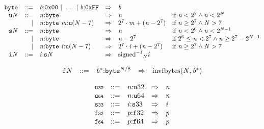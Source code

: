 \vspace{1ex}

\vspace{1ex}

$$
\begin{array}{@{}l@{}rrlll@{}l@{}}
& {\mathtt{byte}} &::=& {\mathit{b}}{:}\mathtt{0x00} ~|~ \dots ~|~ {\mathit{b}}{:}\mathtt{0xFF} &\Rightarrow& {\mathit{b}} \\
& {{\mathtt{u}}}{{\mathit{N}}} &::=& {\mathit{n}}{:}{\mathtt{byte}} &\Rightarrow& {\mathit{n}} &\quad
  \mbox{if}~{\mathit{n}} < {2^{7}} \land {\mathit{n}} < {2^{{\mathit{N}}}} \\ &&|&
{\mathit{n}}{:}{\mathtt{byte}}~{\mathit{m}}{:}{{\mathtt{u}}}{({\mathit{N}} - 7)} &\Rightarrow& {2^{7}} \cdot {\mathit{m}} + ({\mathit{n}} - {2^{7}}) &\quad
  \mbox{if}~{\mathit{n}} \geq {2^{7}} \land {\mathit{N}} > 7 \\
& {{\mathtt{s}}}{{\mathit{N}}} &::=& {\mathit{n}}{:}{\mathtt{byte}} &\Rightarrow& {\mathit{n}} &\quad
  \mbox{if}~{\mathit{n}} < {2^{6}} \land {\mathit{n}} < {2^{{\mathit{N}} - 1}} \\ &&|&
{\mathit{n}}{:}{\mathtt{byte}} &\Rightarrow& {\mathit{n}} - {2^{7}} &\quad
  \mbox{if}~{2^{6}} \leq {\mathit{n}} < {2^{7}} \land {\mathit{n}} \geq {2^{7}} - {2^{{\mathit{N}} - 1}} \\ &&|&
{\mathit{n}}{:}{\mathtt{byte}}~{\mathit{i}}{:}{{\mathtt{u}}}{({\mathit{N}} - 7)} &\Rightarrow& {2^{7}} \cdot {\mathit{i}} + ({\mathit{n}} - {2^{7}}) &\quad
  \mbox{if}~{\mathit{n}} \geq {2^{7}} \land {\mathit{N}} > 7 \\
& {{\mathtt{i}}}{{\mathit{N}}} &::=& {\mathit{i}}{:}{{\mathtt{s}}}{{\mathit{N}}} &\Rightarrow& {{{{{\mathrm{signed}}^{{-1}}}}{}}_{{\mathit{N}}}}{{\mathit{i}}} \\
\end{array}
$$

\vspace{1ex}

$$
\begin{array}{@{}l@{}rrlll@{}l@{}}
& {{\mathtt{f}}}{{\mathit{N}}} &::=& {{\mathit{b}}^\ast}{:}{{\mathtt{byte}}^{{\mathit{N}} / 8}} &\Rightarrow& {\mathrm{invfbytes}}({\mathit{N}}, {{\mathit{b}}^\ast}) \\
\end{array}
$$

\vspace{1ex}

$$
\begin{array}{@{}l@{}rrlll@{}l@{}}
& {\mathtt{u{\scriptstyle32}}} &::=& {\mathit{n}}{:}{{\mathtt{u}}}{32} &\Rightarrow& {\mathit{n}} \\
& {\mathtt{u{\scriptstyle64}}} &::=& {\mathit{n}}{:}{{\mathtt{u}}}{64} &\Rightarrow& {\mathit{n}} \\
& {\mathtt{s{\scriptstyle33}}} &::=& {\mathit{i}}{:}{{\mathtt{s}}}{33} &\Rightarrow& {\mathit{i}} \\
& {\mathtt{f{\scriptstyle32}}} &::=& {\mathit{p}}{:}{{\mathtt{f}}}{32} &\Rightarrow& {\mathit{p}} \\
& {\mathtt{f{\scriptstyle64}}} &::=& {\mathit{p}}{:}{{\mathtt{f}}}{64} &\Rightarrow& {\mathit{p}} \\
\end{array}
$$

